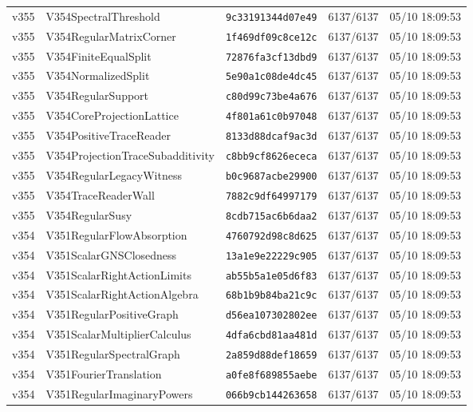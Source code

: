 \documentclass[11pt]{article}
\theoremstyle{definition}\newtheorem{deriv}{Derivation}
\begin{document}
{\begin{longtable}{@{}lllll@{}}
v355 & V354SpectralThreshold & \texttt{9c33191344d07e49} & 6137/6137 & 05/10 18:09:53 \\
v355 & V354RegularMatrixCorner & \texttt{1f469df09c8ce12c} & 6137/6137 & 05/10 18:09:53 \\
v355 & V354FiniteEqualSplit & \texttt{72876fa3cf13dbd9} & 6137/6137 & 05/10 18:09:53 \\
v355 & V354NormalizedSplit & \texttt{5e90a1c08de4dc45} & 6137/6137 & 05/10 18:09:53 \\
v355 & V354RegularSupport & \texttt{c80d99c73be4a676} & 6137/6137 & 05/10 18:09:53 \\
v355 & V354CoreProjectionLattice & \texttt{4f801a61c0b97048} & 6137/6137 & 05/10 18:09:53 \\
v355 & V354PositiveTraceReader & \texttt{8133d88dcaf9ac3d} & 6137/6137 & 05/10 18:09:53 \\
v355 & V354ProjectionTraceSubadditivity & \texttt{c8bb9cf8626ececa} & 6137/6137 & 05/10 18:09:53 \\
v355 & V354RegularLegacyWitness & \texttt{b0c9687acbe29900} & 6137/6137 & 05/10 18:09:53 \\
v355 & V354TraceReaderWall & \texttt{7882c9df64997179} & 6137/6137 & 05/10 18:09:53 \\
v355 & V354RegularSusy & \texttt{8cdb715ac6b6daa2} & 6137/6137 & 05/10 18:09:53 \\
v354 & V351RegularFlowAbsorption & \texttt{4760792d98c8d625} & 6137/6137 & 05/10 18:09:53 \\
v354 & V351ScalarGNSClosedness & \texttt{13a1e9e22229c905} & 6137/6137 & 05/10 18:09:53 \\
v354 & V351ScalarRightActionLimits & \texttt{ab55b5a1e05d6f83} & 6137/6137 & 05/10 18:09:53 \\
v354 & V351ScalarRightActionAlgebra & \texttt{68b1b9b84ba21c9c} & 6137/6137 & 05/10 18:09:53 \\
v354 & V351RegularPositiveGraph & \texttt{d56ea107302802ee} & 6137/6137 & 05/10 18:09:53 \\
v354 & V351ScalarMultiplierCalculus & \texttt{4dfa6cbd81aa481d} & 6137/6137 & 05/10 18:09:53 \\
v354 & V351RegularSpectralGraph & \texttt{2a859d88def18659} & 6137/6137 & 05/10 18:09:53 \\
v354 & V351FourierTranslation & \texttt{a0fe8f689855aebe} & 6137/6137 & 05/10 18:09:53 \\
v354 & V351RegularImaginaryPowers & \texttt{066b9cb144263658} & 6137/6137 & 05/10 18:09:53 \\

\end{longtable}}
\end{document}
